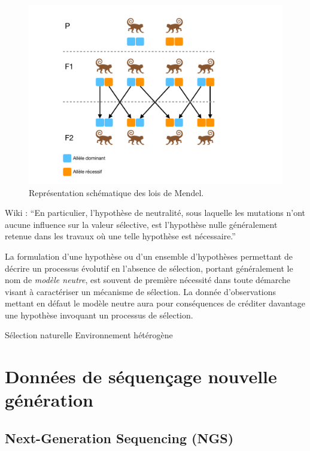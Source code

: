 \documentclass[12pt,twoside]{reedthesis}
\begin{document}
  \begin{figure}
  
  {\centering \includegraphics[width=500px]{figure/mendel} 
  
  }
  
  \caption{Représentation schématique des lois de Mendel.}\label{fig:mendel}
  \end{figure}
  
  Wiki : ``En particulier, l'hypothèse de neutralité, sous laquelle les
  mutations n'ont aucune influence sur la valeur sélective, est
  l'hypothèse nulle généralement retenue dans les travaux où une telle
  hypothèse est nécessaire.''
  
  La formulation d'une hypothèse ou d'un ensemble d'hypothèses permettant
  de décrire un processus évolutif en l'absence de sélection, portant
  généralement le nom de \textit{modèle neutre}, est souvent de première
  nécessité dans toute démarche visant à caractériser un mécanisme de
  sélection. La donnée d'observations mettant en défaut le modèle neutre
  aura pour conséquences de créditer davantage une hypothèse invoquant un
  processus de sélection.
  
  Sélection naturelle Environnement hétérogène
  
  \section{Données de séquençage nouvelle
  génération}\label{donnees-de-sequencage-nouvelle-generation}
  
  \subsection{Next-Generation Sequencing
  (NGS)}\label{next-generation-sequencing-ngs}
  
\end{document}
